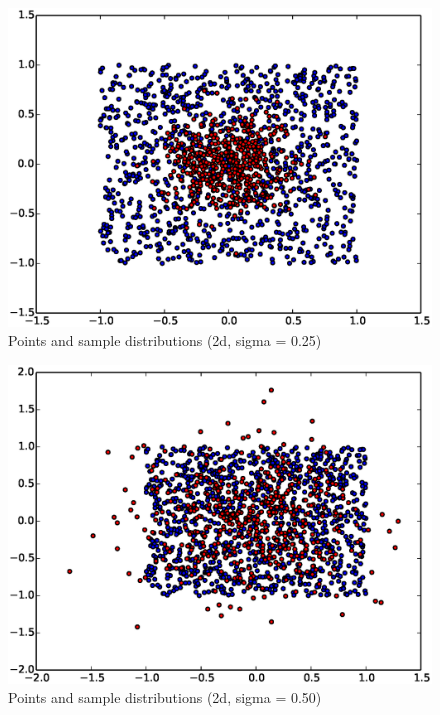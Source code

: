\documentclass[mcs]{scsthesis}
\begin{document}
\begin{figure}
\begin{center}
\includegraphics[scale=0.5]{diagrams/pts_plot_sigma0.25.eps}
\caption{Points and sample distributions (2d, sigma = 0.25)}
\label{fig:points_and_sample_2d_0_25}
\end{center}
\end{figure}

\begin{figure}
\begin{center}
\includegraphics[scale=0.5]{diagrams/pts_plot_sigma0.50.eps}
\caption{Points and sample distributions (2d, sigma = 0.50)}
\label{fig:points_and_sample_2d_0_50}
\end{center}
\end{figure}
\end{document}
